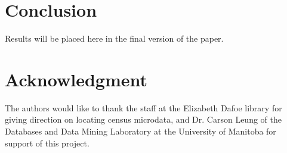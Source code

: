 \documentclass[10pt, conference, compsocconf]{IEEEtran}
\begin{document}
%





\section{Conclusion}
Results will be placed here in the final version of the paper.



\section*{Acknowledgment}


The authors would like to thank the staff at the Elizabeth Dafoe library for giving direction on locating census microdata, and Dr. Carson Leung of the Databases and Data Mining Laboratory at the University of Manitoba for support of this project.


\end{document}
